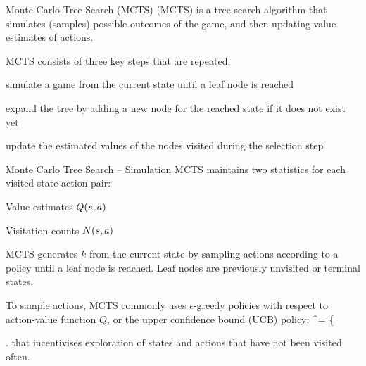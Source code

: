 \begin{frame}[t]{Monte Carlo Tree Search (MCTS)}
     (MCTS) is a tree-search algorithm that simulates (samples) possible outcomes of the game, and then updating value estimates of actions.

    \pause

    MCTS consists of three key steps that are repeated:
    \blist
        \item<3->  simulate a game from the current state until a leaf node is reached
        \item<4->  expand the tree by adding a new node for the reached state if it does not exist yet
        \item<5->  update the estimated values of the nodes visited during the selection step
    \elist
\end{frame}

\begin{frame}[t]{Monte Carlo Tree Search -- Simulation}
    MCTS maintains two statistics for each visited state-action pair:
    \blist
        \item Value estimates $Q(s, a)$
        \item Visitation counts $N(s, a)$
    \elist

    \pause

    MCTS generates $k$  from the current state by sampling actions according to a policy until a leaf node is reached. Leaf nodes are previously unvisited or terminal states.

    \pause

    To sample actions, MCTS commonly uses $\epsilon$-greedy policies with respect to action-value function $Q$, or the upper confidence bound (UCB) policy:
    \bmath
	\ach^\tau = \left\{ \begin{array}{ll}
		\ach &  N(\sth^\tau,\ach) = 0 \\[3pt]
		\arg\max_{\ach \in \Ac} \left( Q(\sth^\tau,\ach) + \sqrt{ \frac{2 \ln N(\sth^\tau)}{N(\sth^\tau,\ach)} } \right) & \text{otherwise}
		\end{array} \right.
    \emath
    that incentivises exploration of states and actions that have not been visited often.
\end{frame}

